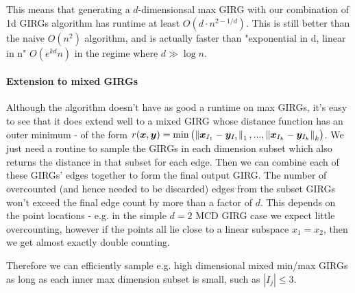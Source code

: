 This means that generating a $d$-dimensionsal max GIRG with our combination of 1d GIRGs algorithm has runtime at least $O(d \cdot n^{2 - 1/d})$. This is still better than the naive $O(n^2)$ algorithm, and is actually faster than "exponential in d, linear in n" $O(e^{kd} n)$ in the regime where $d \gg \log n$.


\paragraph{Extension to mixed GIRGs}
Although the algorithm doesn't have as good a runtime on max GIRGs, it's easy to see that it does extend well to a mixed GIRG whose distance function has an outer minimum - of the form $r(\bm{x}, \bm{y}) = \min \left ( \left\lVert \bm{x}_{I_1} - \bm{y}_{I_1}\right\rVert_1, ..., \left\lVert \bm{x}_{I_k} - \bm{y}_{I_k}\right\rVert_k  \right )$. We just need a routine to sample the GIRGs in each dimension subset which also returns the distance in that subset for each edge. Then we can combine each of these GIRGs' edges together to form the final output GIRG. The number of overcounted (and hence needed to be discarded) edges from the subset GIRGs won't exceed the final edge count by more than a factor of $d$. This depends on the point locations - e.g. in the simple $d=2$ MCD GIRG case we expect little overcounting, however if the points all lie close to a linear subspace $x_1 = x_2$, then we get almost exactly double counting.

Therefore we can efficiently sample e.g. high dimensional mixed min/max GIRGs as long as each inner max dimension subset is small, such as $|I_j| \leq 3$.





